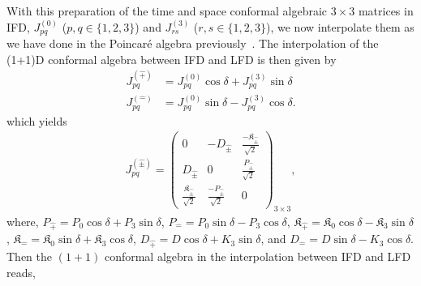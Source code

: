 \documentclass[%
 reprint,
superscriptaddress,
 amsmath,amssymb,
 aps,
]{revtex4-2}
\begin{document}
With this preparation of the time and space conformal algebraic $3\times3$ matrices in IFD, $J^{(0)}_{pq}$ ($p,q\in\{1,2,3\}$) and $J^{(3)}_{rs}$ ($r,s\in\{1,2,3\}$), we now interpolate them as we have done in the Poincar\'e algebra previously~\cite{Ji2001, Ji2025}. The interpolation of the (1+1)D conformal algebra  between IFD and LFD is then given by  
\begin{align}
    J^{(\hat{+})}_{pq}&=J^{(0)}_{pq}\cos{\delta}+J^{(3)}_{pq}\sin{\delta}\\
    J^{(\hat{-})}_{pq}&=J^{(0)}_{pq}\sin{\delta}-J^{(3)}_{pq}\cos{\delta}.
\end{align}
which yields
\begin{align}
    J^{(\hat{\pm})}_{pq}=
  \begin{pmatrix}
  0&-D_{\hat{\pm}}&\frac{-\mathfrak{K}_{\hat{\pm}}}{\sqrt{2}}\\
  D_{\hat{\pm}}&0&\frac{P_{\hat{\pm}}}{\sqrt{2}}\\
    \frac{\mathfrak{K}_{\hat{\pm}}}{\sqrt{2}}&\frac{-P_{\hat{\pm}}}{\sqrt{2}}&0  
  \end{pmatrix}_{3\times3},
\end{align}
where, $P_{\hat{+}}=P_0\cos{\delta}+P_3\sin{\delta}$, $P_{\hat{-}}=P_0\sin{\delta}-P_3\cos{\delta}$, $\mathfrak{K}_{\hat{+}}=\mathfrak{K}_0\cos{\delta}-\mathfrak{K}_3\sin{\delta}$,  $\mathfrak{K}_{\hat{-}}=\mathfrak{K}_0\sin{\delta}+\mathfrak{K}_3\cos{\delta}$, $D_{\hat{+}}=D\cos\delta+K_{3}\sin\delta$, and $D_{\hat{-}}=D\sin\delta-K_{3}\cos\delta$.
Then the $(1+1)$ conformal algebra in the interpolation between IFD and LFD reads,
\end{document}
